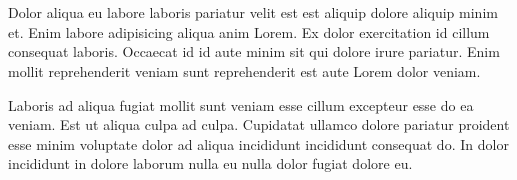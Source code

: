 \chapter{\abstractname}

Dolor aliqua eu labore laboris pariatur velit est est aliquip dolore aliquip minim et. Enim labore adipisicing aliqua anim Lorem. Ex dolor exercitation id cillum consequat laboris. Occaecat id id aute minim sit qui dolore irure pariatur. Enim mollit reprehenderit veniam sunt reprehenderit est aute Lorem dolor veniam.

Laboris ad aliqua fugiat mollit sunt veniam esse cillum excepteur esse do ea veniam. Est ut aliqua culpa ad culpa. Cupidatat ullamco dolore pariatur proident esse minim voluptate dolor ad aliqua incididunt incididunt consequat do. In dolor incididunt in dolore laborum nulla eu nulla dolor fugiat dolore eu.